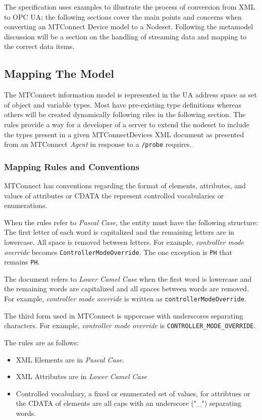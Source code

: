 The specification uses examples to illustrate the process of conversion from XML to OPC UA; the following sections cover the main points and concerns when converting an MTConnect Device model to a Nodeset. Following the metamodel discussion will be a section on the handling of streaming data and mapping to the correct data items. 

\subsection{Mapping The Model}
\lstset{language=XML,numbers=left,xleftmargin=2em}

The MTConnect information model is represented in the UA address space as set of object and variable types. Most have pre-existing type definitions whereas others will be created dynamically following riles in the following section. The rules provide a way for a developer of a server to extend the nodeset to include the types present in a given MTConnectDevices XML document as presented from an MTConnect \textit{Agent} in response to a \texttt{/probe} requires.

\subsubsection{Mapping Rules and Conventions}

MTConnect has conventions regarding the format of elements, attributes, and values of attributes or CDATA the represent controlled vocabularies or enumerations. 

When the rules refer to \textit{Pascal Case}, the entity must have the following structure: The first letter of each word is capitalized and the remaining letters are in lowercase. All space is removed between letters. For example, \textit{controller mode override} becomes \texttt{Controller\-Mode\-Override}. The one exception is \texttt{PH} that remains \texttt{PH}.

The document refers to \textit{Lower Camel Case} when the first word is lowercase and the remaining words are capitalized and all spaces between words are removed. For example, \textit{controller mode override} is written as \texttt{controllerModeOverride}.

The third form used in MTConnect is uppercase with underscores separating characters. For example, \textit{controller mode override} is \texttt{CONTROLLER_MODE_OVERRIDE}.

The rules are as follows:
\begin{itemize}
\item XML Elements are in \textit{Pascal Case}.
\item XML Attributes are in \textit{Lower Camel Case}
\item Controlled vocabulary, a fixed or enumerated set of values, for attribtues or the CDATA of elements are all caps with an underscore ("\_") separating words. 
\end{itemize}


